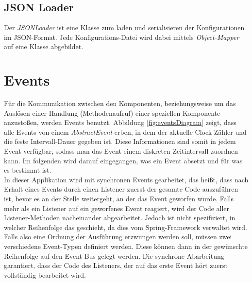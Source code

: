 \subsection{JSON Loader}
Der \textit{JSONLoader} ist eine Klasse zum laden und serialisieren der Konfigurationen im JSON-Format. Jede Konfigurations-Datei wird dabei mittels \textit{Object-Mapper} auf eine Klasse abgebildet.

\section{Events}
\label{sec:Aufbau:Events}
Für die Kommunikation zwischen den Komponenten, beziehungsweise um das Auslösen einer Handlung (Methodenaufruf) einer speziellen Komponente anzustoßen, werden Events benutzt. Abbildung \ref{fig:eventsDiagram} zeigt, dass alle Events von einem \textit{AbstractEvent} erben, in dem der aktuelle Clock-Zähler und die feste Intervall-Dauer gegeben ist. Diese Informationen sind somit in jedem Event verfügbar, sodass man das Event einem diskreten Zeitintervall zuordnen kann. Im folgenden wird darauf eingegangen, was ein Event absetzt und für was es bestimmt ist.\\
In dieser Applikation wird mit synchronen Events gearbeitet, das heißt, dass nach Erhalt eines Events durch einen Listener zuerst der gesamte Code auszuführen ist, bevor es an der Stelle weitergeht, an der das Event geworfen wurde. Falls mehr als ein Listener auf ein geworfenes Event reagiert, wird der Code aller Listener-Methoden nacheinander abgearbeitet. Jedoch ist nicht spezifiziert, in welcher Reihenfolge das geschieht, da dies vom Spring-Framework verwaltet wird. Falls also eine Ordnung der Ausführung erzwungen werden soll, müssen zwei verschiedene Event-Typen definiert werden. Diese können dann in der gewünschte Reihenfolge auf den Event-Bus gelegt werden. Die synchrone Abarbeitung garantiert, dass der Code des Listeners, der auf das erste Event hört zuerst vollständig bearbeitet wird.




